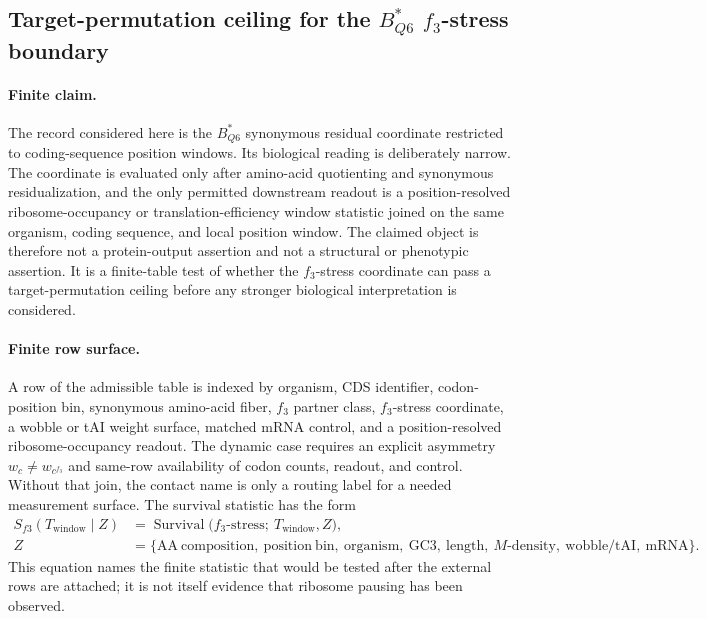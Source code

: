 
\subsection{Target-permutation ceiling for the $B^{\ast}_{Q6}$ $f_3$-stress boundary}
\label{sec:bioreality-target-noise-ceiling-bstar-q6-f3-stress}

\paragraph{Finite claim.}
The record considered here is the $B^{\ast}_{Q6}$ synonymous residual coordinate restricted to coding-sequence position windows.  Its biological reading is deliberately narrow.  The coordinate is evaluated only after amino-acid quotienting and synonymous residualization, and the only permitted downstream readout is a position-resolved ribosome-occupancy or translation-efficiency window statistic joined on the same organism, coding sequence, and local position window.  The claimed object is therefore not a protein-output assertion and not a structural or phenotypic assertion.  It is a finite-table test of whether the $f_3$-stress coordinate can pass a target-permutation ceiling before any stronger biological interpretation is considered.

\paragraph{Finite row surface.}
A row of the admissible table is indexed by organism, CDS identifier, codon-position bin, synonymous amino-acid fiber, $f_3$ partner class, $f_3$-stress coordinate, a wobble or tAI weight surface, matched mRNA control, and a position-resolved ribosome-occupancy readout.  The dynamic case requires an explicit asymmetry $w_c \neq w_{c^{f_3}}$ and same-row availability of codon counts, readout, and control.  Without that join, the contact name is only a routing label for a needed measurement surface.  The survival statistic has the form
$$
\begin{aligned}
S_{f3}(T_{\mathrm{window}} \mid Z)
  &= \operatorname{Survival}\bigl(f_3\text{-stress};\ T_{\mathrm{window}}, Z\bigr),\\
Z
  &= \{\mathrm{AA\ composition},\ \mathrm{position\ bin},\ \mathrm{organism},\ \mathrm{GC3},\ \mathrm{length},\ M\text{-}\mathrm{density},\ \mathrm{wobble/tAI},\ \mathrm{mRNA}\}.
\end{aligned}
$$
This equation names the finite statistic that would be tested after the external rows are attached; it is not itself evidence that ribosome pausing has been observed.

